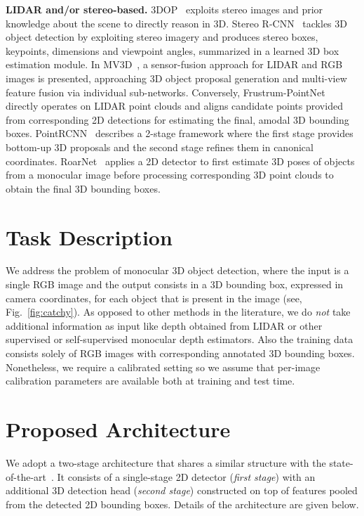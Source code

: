 \documentclass[10pt,twocolumn,letterpaper]{article}
\renewcommand{\paragraph}[1]{

        \vspace{3pt}
	\noindent\textbf{#1}}
\begin{document}
\paragraph{LIDAR and/or stereo-based.}
3DOP~\cite{NIPS2015_Chen} exploits stereo images and prior knowledge about the scene to directly reason in 3D. Stereo R-CNN~\cite{cvpr19stereorcnn} tackles 3D object detection by exploiting stereo imagery and produces stereo boxes, keypoints, dimensions and viewpoint angles, summarized in a learned 3D box estimation module. In MV3D~\cite{Chen_2017_CVPR}, a sensor-fusion approach for LIDAR and RGB images is presented, approaching 3D object proposal generation and multi-view feature fusion via individual sub-networks. Conversely, Frustrum-PointNet~\cite{Qi_2018_CVPR} directly operates on LIDAR point clouds and aligns candidate points provided from corresponding 2D detections for estimating the final, amodal 3D bounding boxes. PointRCNN~\cite{shi2018pointrcnn} describes a 2-stage framework where the first stage provides bottom-up 3D proposals and the second stage refines them in canonical coordinates. RoarNet~\cite{Shin_arxiv_18} applies a 2D detector to first estimate 3D poses of objects from a monocular image before processing corresponding 3D point clouds to obtain the final 3D bounding boxes. 

\section{Task Description}

We address the problem of monocular 3D object detection, where the input is a single RGB image and the output consists in a 3D bounding box, expressed in camera coordinates, for each object that is present in the image (see, Fig.~\ref{fig:catchy}).
As opposed to other methods in the literature, we do \emph{not} take additional information as input like depth obtained from LIDAR or other supervised or self-supervised monocular depth estimators. Also the training data consists solely of RGB images with corresponding annotated 3D bounding boxes. Nonetheless, we require a calibrated setting so we assume that per-image calibration parameters are available both at training and test time.


\section{Proposed Architecture}

We adopt a two-stage architecture that shares a similar structure with the state-of-the-art~\cite{Manhardt_2019_CVPR}. It consists of a single-stage 2D detector (\emph{first stage}) with an additional 3D detection head (\emph{second stage}) constructed on top of features pooled from the detected 2D bounding boxes. Details of the architecture are given below.
\end{document}
